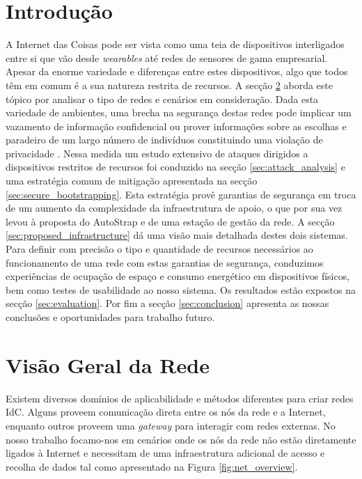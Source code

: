 \documentclass{llncs}
\begin{document}
\section{Introdução}
A Internet das Coisas pode ser vista como uma teia de dispositivos interligados entre si que vão desde \textit{wearables} até redes de sensores de gama empresarial. Apesar da enorme variedade e diferenças entre estes dispositivos, algo que todos têm em comum é a sua natureza restrita de recursos. A secção \ref{sec:network_overview} aborda este tópico por analisar o tipo de redes e cenários em consideração. Dada esta variedade de ambientes, uma brecha na segurança destas redes pode implicar um vazamento de informação confidencial ou prover informações sobre as escolhas e paradeiro de um largo número de indivíduos constituindo uma violação de privacidade \cite{Ukil2015}. Nessa medida um estudo extensivo de ataques dirigidos a dispositivos restritos de recursos foi conduzido na secção \ref{sec:attack_analysis} e uma estratégia comum de mitigação apresentada na secção \ref{sec:secure_bootstrapping}. Esta estratégia provê garantias de segurança em troca de um aumento da complexidade da infraestrutura de apoio, o que por sua vez levou à proposta do AutoStrap e de uma estação de gestão da rede. A secção \ref{sec:proposed_infrastructure} dá uma visão mais detalhada destes dois sistemas. Para definir com precisão o tipo e quantidade de recursos necessários ao funcionamento de uma rede com estas garantias de segurança, conduzimos experiências de ocupação de espaço e consumo energético em dispositivos físicos, bem como testes de usabilidade ao nosso sistema. Os resultados estão expostos na secção \ref{sec:evaluation}. Por fim a secção \ref{sec:conclusion} apresenta as nossas conclusões e oportunidades para trabalho futuro.


\section{Visão Geral da Rede}
\label{sec:network_overview}
Existem diversos domínios de aplicabilidade e métodos diferentes para criar redes \ac{IdC}. Alguns proveem comunicação direta entre os nós da rede e a Internet, enquanto outros proveem uma \textit{gateway} para interagir com redes externas. No nosso trabalho focamo-nos em cenários onde os nós da rede não estão diretamente ligados à Internet e necessitam de uma infraestrutura adicional de acesso e recolha de dados tal como apresentado na Figura \ref{fig:net_overview}.
\end{document}
